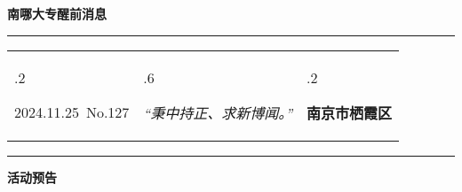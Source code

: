 \documentclass[letterpaper, 12pt]{article}
\begin{document}
\begin{center}
    \Huge\textbf{南哪大专醒前消息}
\end{center}
\vspace{4mm}
\hrule
\renewcommand\tabularxcolumn[1]{m{#1}}
\begin{tabularx}{\textwidth}{>{\hsize.2\hsize}X>{\hsize.6\hsize}X>{\hsize.2\hsize}X}
    \begin{flushleft}
        2024.11.25\, No.127
    \end{flushleft}
    &
    \begin{center}
        \textit{“秉中持正、求新博闻。”}
    \end{center}
    &
    \begin{flushright}
        \textbf{南京市栖霞区}
    \end{flushright}
\end{tabularx}
\vspace{-3.5mm}
\hrule
\vspace{4mm}
\centerline{\huge\textbf{活动预告}}
\end{document}
